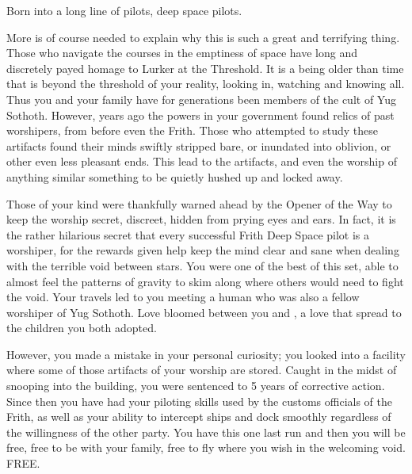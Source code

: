 \documentclass[char]{guildcamp4}
\begin{document}
\name{\cPilot{}}

Born into a long line of pilots, deep space pilots. 

More is of course needed to explain why this is such a great and terrifying thing.
Those who navigate the courses in the emptiness of space have long and discretely payed homage to Lurker at the Threshold. It is a being older than time that is beyond the threshold of your reality, looking in, watching and knowing all. Thus you and your family have for generations been members of the cult of Yug Sothoth. However, years ago the powers in your government found relics of past worshipers, from before even the Frith. Those who attempted to study these artifacts found their minds swiftly stripped bare, or inundated into oblivion, or other even less pleasant ends. This lead to the artifacts, and even the worship of anything similar something to be quietly hushed up and locked away. 

Those of your kind were thankfully warned ahead by the Opener of the Way to keep the worship secret, discreet, hidden from prying eyes and ears. 
In fact, it is the rather hilarious secret that every successful Frith Deep Space pilot is a worshiper, for the rewards given help keep the mind clear and sane when dealing with the terrible void between stars. You were one of the best of this set, able to almost feel the patterns of gravity to skim along where others would need to fight the void. Your travels led to you meeting a human who was also a fellow worshiper of Yug Sothoth.  Love bloomed between you and \cAlice{}, a love that spread to the children you both adopted. 

However, you made a mistake in your personal curiosity; you looked into a facility where some of those artifacts of your worship are stored. Caught in the midst of snooping into the building, you were sentenced to 5 years of corrective action. Since then you have had your piloting skills used by the customs officials of the Frith, as well as your ability to intercept ships and dock smoothly regardless of the willingness of the other party. 
You have this one last run and then you will be free, free to be with your family, free to fly where you wish in the welcoming void. FREE. 

\begin{comment}
\begin{itemz}[Backstory]
    \item A pilot who committed a crime, and is now on probation.
    \item Helping law enforcement as community service / rehabilitation / reintegration.
    \item Has human spouse, sympathetic to humans. Could lose kids if violates parole.
    \item Shares cult religion with Rasputin. Wants to further cult's goals.
    \item Religion's goal is to know everything. Got caught snooping where he/she shouldn't have been. Sent to prison for indeterminate amt of time.
    \item All Yog'Sothoth-related activity is illegal in Frith space.
\end{itemz}
\end{comment}
\end{document}
